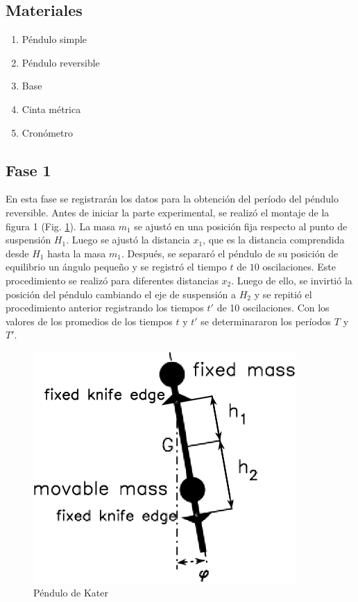 \documentclass[spanish,notitlepage,letterpaper, 12pt]{article}
\begin{document}
\subsection{Materiales}
\begin{enumerate}
    \item Péndulo simple
    \item Péndulo reversible
    \item Base
    \item Cinta métrica
    \item Cronómetro
\end{enumerate}
\subsection{Fase 1}
En esta fase se registrarán los datos para la obtención del período del péndulo reversible. Antes de iniciar la parte experimental, se realizó el montaje de la figura 1 (Fig. \ref{Figura 3}). La masa $m_1$ se ajustó en una posición fija respecto al punto de suspensión $H_1$. Luego se ajustó la distancia $x_1$, que es la distancia comprendida desde $H_1$ hasta la masa $m_1$. Después, se separaró el péndulo de su posición de equilibrio un ángulo pequeño y se registró el tiempo $t$ de $10$ oscilaciones. Este procedimiento se realizó para diferentes distancias $x_2$.
Luego de ello, se invirtió la posición del péndulo cambiando el eje de suspensión a
$H_2$ y se repitió el procedimiento anterior registrando los tiempos $t\prime$ de 10 oscilaciones. Con los valores de los promedios de los tiempos $t$ y $t\prime$ se determinararon los
períodos $T$ y $T\prime$.
\begin{figure}[h]
    \centering
    \includegraphics[width=10.0cm]{images/Pendulo-Kater.png}
    \caption{Péndulo de Kater}
    \label{Figura 3}
\end{figure}
\end{document}
